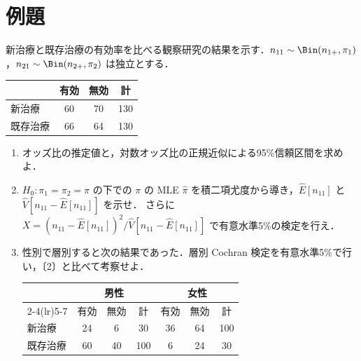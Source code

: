 \section{例題}\label{sec:m07-reidai}
\begin{reidai}\label{reidai:m07-1}
新治療と既存治療の有効率を比べる観察研究の結果を示す．$n_{11}\sim\Bin(n_{1+},\pi_1)$，$n_{21}\sim\Bin(n_{2+},\pi_2)$ は独立とする．
\begin{center}\small
\begin{tabular}{@{}lccc@{}}
\toprule
 & 有効 & 無効 & 計\\
\midrule
新治療 & 60 & 70 & 130\\
既存治療 & 66 & 64 & 130\\
\bottomrule
\end{tabular}
\end{center}
\begin{enumerate}[label=〔\arabic*〕]
\item オッズ比の推定値と，対数オッズ比の正規近似による95\%信頼区間を求めよ．
\item $H_0:\pi_1=\pi_2=\pi$ の下での $\pi$ の MLE $\hat\pi$ を積二項尤度から導き，$\hat E[n_{11}]$ と $\hat V[n_{11}-\hat E[n_{11}]]$ を示せ．
      さらに $X=(n_{11}-\hat E[n_{11}])^2/\hat V[n_{11}-\hat E[n_{11}]]$ で有意水準5\%の検定を行え．
\item 性別で層別すると次の結果であった．層別 Cochran 検定を有意水準5\%で行い，〔2〕と比べて考察せよ．
\begin{center}\small
\begin{tabular}{@{}lcccccc@{}}
\toprule
 & \multicolumn{3}{c}{男性} & \multicolumn{3}{c}{女性}\\
\cmidrule(lr){2-4}\cmidrule(lr){5-7}
 & 有効 & 無効 & 計 & 有効 & 無効 & 計\\
\midrule
新治療 & 24 & 6 & 30 & 36 & 64 & 100\\
既存治療 & 60 & 40 & 100 & 6 & 24 & 30\\
\bottomrule
\end{tabular}
\end{center}
\end{enumerate}
\end{reidai}

